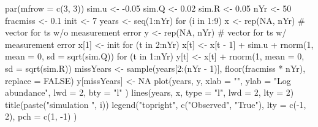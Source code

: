 \begin{Schunk}
\begin{Sinput}
 par(mfrow = c(3, 3))
 sim.u <- -0.05
 sim.Q <- 0.02
 sim.R <- 0.05
 nYr <- 50
 fracmiss <- 0.1
 init <- 7
 years <- seq(1:nYr)
 for (i in 1:9) {
   x <- rep(NA, nYr) # vector for ts w/o measurement error
   y <- rep(NA, nYr) # vector for ts w/ measurement error
   x[1] <- init
   for (t in 2:nYr) {
     x[t] <- x[t - 1] + sim.u + rnorm(1, mean = 0, sd = sqrt(sim.Q))
   }
   for (t in 1:nYr) {
     y[t] <- x[t] + rnorm(1, mean = 0, sd = sqrt(sim.R))
   }
   missYears <-
     sample(years[2:(nYr - 1)], floor(fracmiss * nYr), replace = FALSE)
   y[missYears] <- NA
   plot(years, y,
     xlab = "", ylab = "Log abundance", lwd = 2, bty = "l"
   )
   lines(years, x, type = "l", lwd = 2, lty = 2)
   title(paste("simulation ", i))
 }
 legend("topright", c("Observed", "True"),
   lty = c(-1, 2), pch = c(1, -1)
 )
\end{Sinput}
\end{Schunk}
